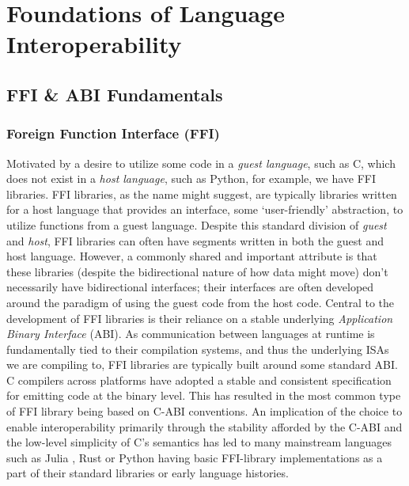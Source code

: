 \section{Foundations of Language Interoperability}\label{s:background}

\subsection{FFI \& ABI Fundamentals}\label{s:language_interoperability_foundations}

\subsubsection{Foreign Function Interface (FFI)}\label{s:foreign_function_interface}

Motivated by a desire to utilize some code in a \textit{guest language}, such as C, which does not exist in a \textit{host language}, such as Python, for example, we have FFI libraries. FFI libraries, as the name might suggest, are typically libraries written for a host language that provides an interface, \ie some `user-friendly' abstraction, to utilize functions from a guest language. Despite this standard division of \textit{guest} and \textit{host}, FFI libraries can often have segments written in both the guest and host language. However, a commonly shared and important attribute is that these libraries (despite the bidirectional nature of how data might move) don't necessarily have bidirectional interfaces; their interfaces are often developed around the paradigm of using the guest code from the host code. Central to the development of FFI libraries is their reliance on a stable underlying \textit{Application Binary Interface} (ABI). As communication between languages at runtime is fundamentally tied to their compilation systems, and thus the underlying ISAs we are compiling to, FFI libraries are typically built around some standard ABI. C compilers across platforms have adopted a stable and consistent specification for emitting code at the binary level. This has resulted in the most common type of FFI library being based on C-ABI conventions. An implication of the choice to enable interoperability primarily through the stability afforded by the C-ABI and the low-level simplicity of C's semantics has led to many mainstream languages such as Julia \cite{juliaEmbedding}, Rust \cite{rustFFINomicon} or Python \cite{cffi} having basic FFI-library implementations as a part of their standard libraries or early language histories.


